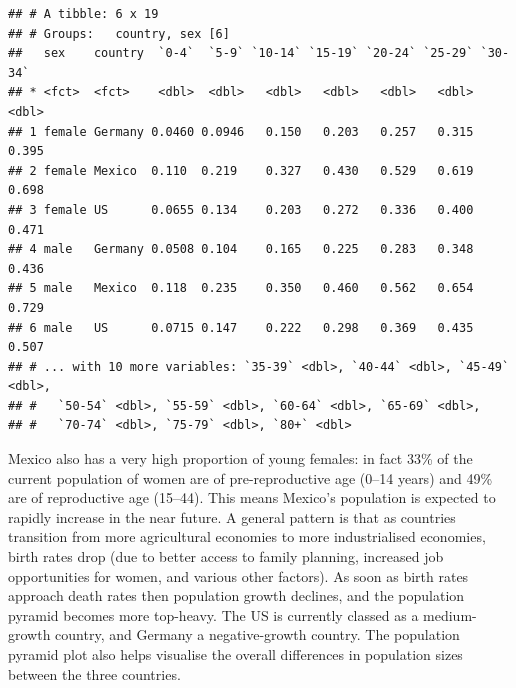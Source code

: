 \documentclass[]{book}
\newenvironment{Shaded}{\begin{snugshade}}{\end{snugshade}}
\newcommand{\KeywordTok}[1]{\textcolor[rgb]{0.13,0.29,0.53}{\textbf{{#1}}}}
\newcommand{\DataTypeTok}[1]{\textcolor[rgb]{0.13,0.29,0.53}{{#1}}}
\newcommand{\StringTok}[1]{\textcolor[rgb]{0.31,0.60,0.02}{{#1}}}
\newcommand{\NormalTok}[1]{{#1}}
\theoremstyle{definition}
\theoremstyle{definition}
\theoremstyle{definition}
\theoremstyle{remark}
\begin{document}
\begin{Shaded}
\end{Shaded}

\begin{verbatim}
## # A tibble: 6 x 19
## # Groups:   country, sex [6]
##   sex    country  `0-4`  `5-9` `10-14` `15-19` `20-24` `25-29` `30-34`
## * <fct>  <fct>    <dbl>  <dbl>   <dbl>   <dbl>   <dbl>   <dbl>   <dbl>
## 1 female Germany 0.0460 0.0946   0.150   0.203   0.257   0.315   0.395
## 2 female Mexico  0.110  0.219    0.327   0.430   0.529   0.619   0.698
## 3 female US      0.0655 0.134    0.203   0.272   0.336   0.400   0.471
## 4 male   Germany 0.0508 0.104    0.165   0.225   0.283   0.348   0.436
## 5 male   Mexico  0.118  0.235    0.350   0.460   0.562   0.654   0.729
## 6 male   US      0.0715 0.147    0.222   0.298   0.369   0.435   0.507
## # ... with 10 more variables: `35-39` <dbl>, `40-44` <dbl>, `45-49` <dbl>,
## #   `50-54` <dbl>, `55-59` <dbl>, `60-64` <dbl>, `65-69` <dbl>,
## #   `70-74` <dbl>, `75-79` <dbl>, `80+` <dbl>
\end{verbatim}

Mexico also has a very high proportion of young females: in fact 33\% of
the current population of women are of pre-reproductive age (0--14
years) and 49\% are of reproductive age (15--44). This means Mexico's
population is expected to rapidly increase in the near future. A general
pattern is that as countries transition from more agricultural economies
to more industrialised economies, birth rates drop (due to better access
to family planning, increased job opportunities for women, and various
other factors). As soon as birth rates approach death rates then
population growth declines, and the population pyramid becomes more
top-heavy. The US is currently classed as a medium-growth country, and
Germany a negative-growth country. The population pyramid plot also
helps visualise the overall differences in population sizes between the
three countries.
\end{document}
